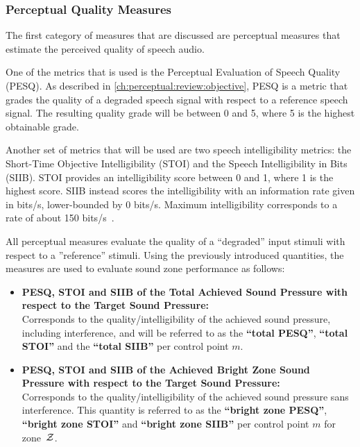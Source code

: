 \subsubsection{Perceptual Quality Measures}
The first category of measures that are discussed are perceptual measures that estimate the perceived 
quality of speech audio.

One of the metrics that is used is the Perceptual Evaluation of Speech Quality (PESQ).
As described in \autoref{ch:perceptual:review:objective}, PESQ is a metric that grades the quality of a 
degraded speech signal with respect to a reference speech signal.
The resulting quality grade will be between 0 and 5, where 5 is the highest obtainable grade.

Another set of metrics that will be used are two speech intelligibility metrics: 
the Short-Time Objective Intelligibility (STOI) and 
the Speech Intelligibility in Bits (SIIB).
STOI provides an intelligibility score between 0 and 1, where 1 is the highest score.
SIIB instead scores the intelligibility with an information rate given in bits/s, lower-bounded by 0 bits/s.
Maximum intelligibility corresponds to a rate of about 150 bits/s~\cite{van2017instrumental}.

All perceptual measures evaluate the quality of a ``degraded'' input stimuli with respect to a ''reference'' stimuli.
Using the previously introduced quantities, the measures are used to evaluate sound zone performance as follows:
\begin{itemize}
    \item \textbf{PESQ, STOI and SIIB of the Total Achieved Sound Pressure with 
        respect to the Target Sound Pressure:}\\
        Corresponds to the quality/intelligibility of the achieved sound pressure,
        including interference, and will be referred 
        to as the \textbf{``total PESQ''}, \textbf{``total STOI''} and the \textbf{``total SIIB''} per control point $m$. 
    \item \textbf{PESQ, STOI and SIIB of the Achieved Bright Zone Sound Pressure with 
        respect to the Target Sound Pressure:}\\
        Corresponds to the quality/intelligibility of the achieved sound pressure sans interference.
        This quantity is referred to as the \textbf{``bright zone PESQ''}, \textbf{``bright zone STOI''} and \textbf{``bright zone SIIB''}
        per control point $m$ for zone~$\mathcal{Z}$.
\end{itemize}

